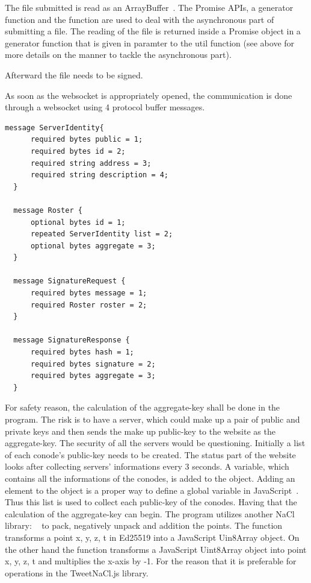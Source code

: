\documentclass[11pt, a4paper, twoside, openright, openany]{article}
\begin{document}
The file submitted is read as an ArrayBuffer~\cite{ArrayBuffer}. The Promise APIs,
a generator function and the  function are used to deal with
the asynchronous part of submitting a file. The reading of the file is returned
inside a Promise object in a generator function that is given in paramter to the
 util function (see above for more details on
the manner to tackle the asynchronous part). %

Afterward the file needs to be signed.

As soon as the websocket is appropriately opened, the communication is done through a websocket
using 4 protocol buffer messages.
\bigbreak

\begin{lstlisting}[caption={.proto file}, captionpos=b]
  message ServerIdentity{
      required bytes public = 1;
      required bytes id = 2;
      required string address = 3;
      required string description = 4;
  }

  message Roster {
      optional bytes id = 1;
      repeated ServerIdentity list = 2;
      optional bytes aggregate = 3;
  }

  message SignatureRequest {
      required bytes message = 1;
      required Roster roster = 2;
  }

  message SignatureResponse {
      required bytes hash = 1;
      required bytes signature = 2;
      required bytes aggregate = 3;
  }
\end{lstlisting}

For safety reason, the calculation of the aggregate-key shall be done in the program.
The risk is to have a server, which could make up a pair of public and private keys and
then sends the make up public-key to the website as the aggregate-key. The security of
all the servers would be questioning.
\newline \newline
Initially a list of each conode's public-key needs to be created. The status part
of the website looks after collecting servers' informations every 3 seconds. A variable,
which contains all the informations of the conodes, is added to the  object.
Adding an element to the  object is a proper way to define a global variable
in JavaScript~\cite{globalVariable}. Thus this list is used to collect each public-key
of the conodes. Having that the calculation of the aggregate-key can begin.
The program utilizes another NaCl library: ~\cite{tweetNacl} to
pack, negatively unpack and addition the points. The function  transforms a point x, y, z, t in Ed25519
into a JavaScript Uin8Array object. On the other hand the function 
transforms a JavaScript Uint8Array object into point x, y, z, t and multiplies
the x-axis by -1. For the reason that it is preferable for operations in the TweetNaCl.js library.
\bigbreak
\end{document}
